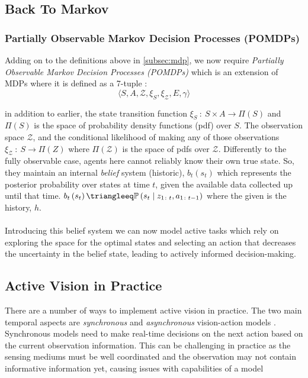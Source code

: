   \subsection{Back To Markov}
  \subsubsection{Partially Observable Markov Decision 
  \label{subsec:pomdp}
  Processes (POMDPs)}
  Adding on to the definitions above in \ref{subsec:mdp}, we now require \emph{Partially Observable Markov Decision Processes (POMDPs)} 
  which is an extension of MDPs where it is defined as a 7-tuple \cite{thrun2002probabilistic,placed2023surveyactivesimultaneouslocalization}: 
  \[\langle S, A, \mathcal{Z}, \xi_S, \xi_{\mathcal{Z}}, E, \gamma \rangle \]
  
  in addition to earlier, the state transition function \( \xi_S ~\colon~ S \times A \rightarrow \Pi\left(S\right)\) and $\Pi\left(S\right)$ is the space of probability density functions (pdf) over $S$. The observation space $\mathcal{Z}$, and the conditional likelihood of making any of those observations \(\xi_{\mathcal{Z}} ~\colon~ S \rightarrow \Pi\left(Z\right)\) where $\Pi\left(\mathcal{Z}\right)$ is the space of pdfs over $\mathcal{Z}$.
  Differently to the fully observable case, agents here cannot reliably know their own true state. So, they maintain an internal \emph{belief} system (historic), $b_t\left(s_t\right)$ which represents the posterior probability over states at time $t$, given the available data collected up until that time. \(b_t\left(s_t\right) \triangleeq  \mathbb{P}\left(s_t \mid z_{1 \colon t}, a_{1 \colon t - 1}\right)\) where the given is the history, $h$.
  \\\\
  Introducing this belief system we can now model active tasks which rely on exploring the space for the optimal states and selecting an action that decreases the uncertainty in the belief state, leading to actively informed decision-making.

  
  \subsection{Active Vision in Practice}
  There are a number of ways to implement active vision in practice. The two main temporal aspects are \emph{synchronous} and \emph{asynchronous} vision-action models \cite{divyaHandEyeCoordsination}. Synchronous models need to make real-time decisions on the next action based on the current observation information. This can be challenging in practice as the sensing mediums must be well coordinated and the observation may not contain informative information yet, causing issues with capabilities of a model
  \label{subsubsec:asynch-synch}

